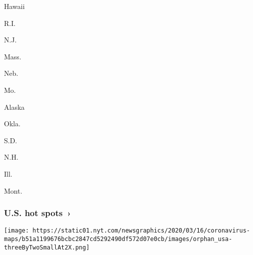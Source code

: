 \href{https://www.nytimes.com/interactive/2020/us/hawaii-coronavirus-cases.html}{}

Hawaii

\href{https://www.nytimes.com/interactive/2020/us/rhode-island-coronavirus-cases.html}{}

R.I.

\href{https://www.nytimes.com/interactive/2020/us/new-jersey-coronavirus-cases.html}{}

N.J.

\href{https://www.nytimes.com/interactive/2020/us/massachusetts-coronavirus-cases.html}{}

Mass.

\href{https://www.nytimes.com/interactive/2020/us/nebraska-coronavirus-cases.html}{}

Neb.

\href{https://www.nytimes.com/interactive/2020/us/missouri-coronavirus-cases.html}{}

Mo.

\href{https://www.nytimes.com/interactive/2020/us/alaska-coronavirus-cases.html}{}

Alaska

\href{https://www.nytimes.com/interactive/2020/us/oklahoma-coronavirus-cases.html}{}

Okla.

\href{https://www.nytimes.com/interactive/2020/us/south-dakota-coronavirus-cases.html}{}

S.D.

\href{https://www.nytimes.com/interactive/2020/us/new-hampshire-coronavirus-cases.html}{}

N.H.

\href{https://www.nytimes.com/interactive/2020/us/illinois-coronavirus-cases.html}{}

Ill.

\href{https://www.nytimes.com/interactive/2020/us/montana-coronavirus-cases.html}{}

Mont.

\href{https://www.nytimes.com/interactive/2020/us/coronavirus-us-cases.html}{}

\hypertarget{us-hot-spots-}{%
\subsubsection{U.S. hot spots~›}\label{us-hot-spots-}}

\texttt{[image: https://static01.nyt.com/newsgraphics/2020/03/16/coronavirus-maps/b51a1199676bcbc2847cd5292490df572d07e0cb/images/orphan\_usa-threeByTwoSmallAt2X.png]}


